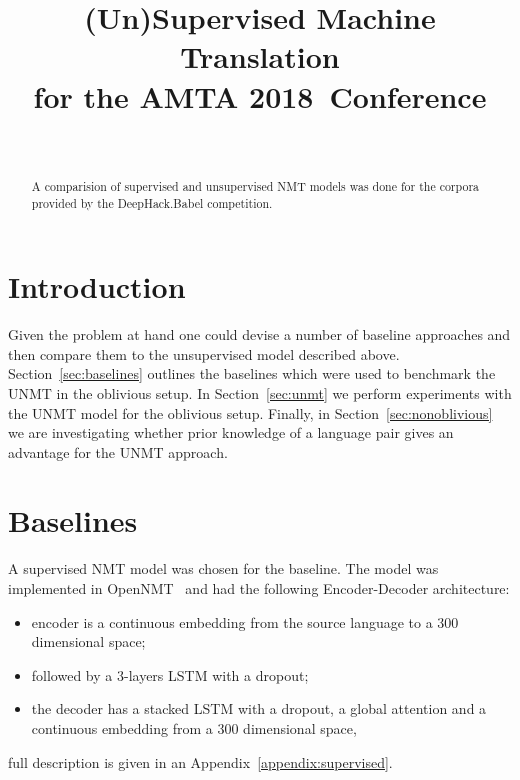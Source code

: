 \documentclass[]{article}
\newcommand{\confname}{AMTA 2018}
\begin{document}
\title{\bf (Un)Supervised Machine Translation \\
  for the \confname~Conference}
\author{ \hfill  {}\\
\AND
         \hfill {}
}

\maketitle
\pagestyle{empty}

\begin{abstract}
  A comparision of supervised and unsupervised NMT models was done for the corpora provided by the DeepHack.Babel competition.
\end{abstract}

\section{Introduction}


Given the problem at hand one could devise a number of baseline approaches and then compare them to the unsupervised model described above.
Section~\ref{sec:baselines} outlines the baselines which were used to benchmark the UNMT in the oblivious setup.
In Section~\ref{sec:unmt} we perform experiments with the UNMT model for the oblivious setup.
Finally, in Section~\ref{sec:nonoblivious} we are investigating whether prior knowledge of a language pair gives an advantage for the UNMT approach.

\section{Baselines}
\label{sect:baselines}

A supervised NMT model was chosen for the baseline.
The model was implemented in OpenNMT~\citep{opennmt} and had the following Encoder-Decoder architecture:
\begin{itemize}
\item encoder is a continuous embedding from the source language to a $300$ dimensional space;
\item followed by a $3$-layers LSTM with a dropout;
\item the decoder has a stacked LSTM with a dropout, a global attention \citep{bahdanau2014neural} and a continuous embedding from a $300$ dimensional space,
\end{itemize}
full description is given in an Appendix~\ref{appendix:supervised}.
\end{document}
